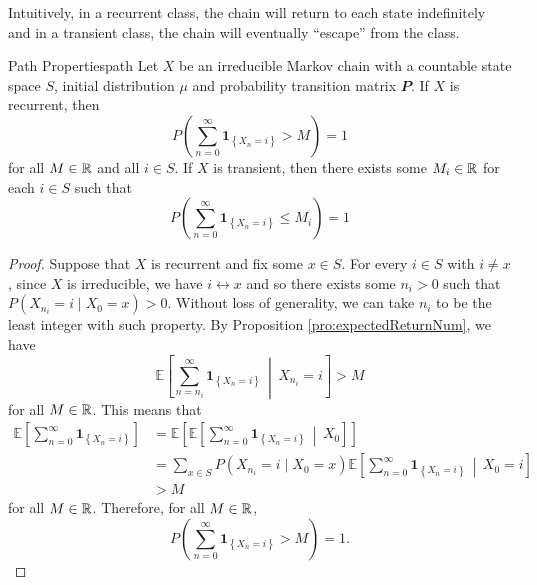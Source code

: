 \documentclass[math, code]{amznotes}
\theoremstyle{remark}
\begin{document}
Intuitively, in a recurrent class, the chain will return to each state indefinitely and in a transient class, the chain will eventually ``escape'' from the class.
\begin{thmbox}{Path Properties}{path}
    Let $X$ be an irreducible Markov chain with a countable state space $S$, initial distribution $\mu$ and probability transition matrix $\mathbfit{P}$. If $X$ is recurrent, then 
    \begin{equation*}
        P\left(\sum_{n = 0}^{\infty}\mathbf{1}_{\left\{X_n = i\right\}} > M\right) = 1
    \end{equation*}
    for all $M \in \mathbb{R}$ and all $i \in S$. If $X$ is transient, then there exists some $M_i \in \mathbb{R}$ for each $i \in S$ such that 
    \begin{equation*}
        P\left(\sum_{n = 0}^{\infty}\mathbf{1}_{\left\{X_n = i\right\}} \leq M_i\right) = 1
    \end{equation*}
    \tcblower
    \begin{proof}
        Suppose that $X$ is recurrent and fix some $x \in S$. For every $i \in S$ with $i \neq x$, since $X$ is irreducible, we have $i \leftrightarrow x$ and so there exists some $n_i > 0$ such that $P\left(X_{n_i} = i \mid X_0 = x\right) > 0$. Without loss of generality, we can take $n_i$ to be the least integer with such property. By Proposition \ref{pro:expectedReturnNum}, we have 
        \begin{equation*}
            \mathbb{E}\left[\sum_{n = n_i}^{\infty}\mathbf{1}_{\left\{X_n = i\right\}} \,\middle\vert\, X_{n_i} = i\right] > M
        \end{equation*}
        for all $M \in \mathbb{R}$. This means that 
        \begin{align*}
            \mathbb{E}\left[\sum_{n = 0}^{\infty}\mathbf{1}_{\left\{X_n = i\right\}}\right] & = \mathbb{E}\left[\mathbb{E}\left[\sum_{n = 0}^{\infty}\mathbf{1}_{\left\{X_n = i\right\}} \,\middle\vert\, X_{0}\right]\right] \\
            & = \sum_{x \in S}P\left(X_{n_i} = i \mid X_0 = x\right)\mathbb{E}\left[\sum_{n = 0}^{\infty}\mathbf{1}_{\left\{X_n = i\right\}} \,\middle\vert\, X_{0} = i\right] \\
            & > M
        \end{align*}
        for all $M \in \mathbb{R}$. Therefore, for all $M \in \mathbb{R}$,
        \begin{equation*}
            P\left(\sum_{n = 0}^{\infty}\mathbf{1}_{\left\{X_n = i\right\}} > M\right) = 1.
        \end{equation*}

\end{proof}
\end{thmbox}
\end{document}
